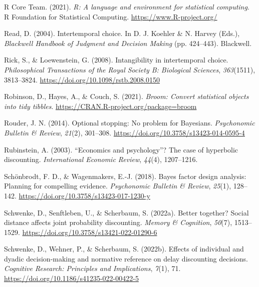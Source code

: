 \documentclass[
  pub,floatsintext]{apa6}
\newlength{\cslhangindent}
\newlength{\cslentryspacingunit} %
\newenvironment{CSLReferences}[2] %
 {%
  \setlength{\parindent}{0pt}
  \ifodd #1
  \let\oldpar\par
  \def\par{\hangindent=\cslhangindent\oldpar}
  \fi
  \setlength{\parskip}{#2\cslentryspacingunit}
 }%
 {}
\begin{document}
\begin{CSLReferences}{1}{0}
\leavevmode{}%
R Core Team. (2021). \emph{R: A language and environment for statistical computing}. R Foundation for Statistical Computing. \url{https://www.R-project.org/}

\leavevmode{}%
Read, D. (2004). Intertemporal choice. In D. J. Koehler \& N. Harvey (Eds.), \emph{Blackwell {Handbook} of {Judgment} and {Decision Making}} (pp. 424--443). {Blackwell}.

\leavevmode{}%
Rick, S., \& Loewenstein, G. (2008). Intangibility in intertemporal choice. \emph{Philosophical Transactions of the Royal Society B: Biological Sciences}, \emph{363}(1511), 3813--3824. \url{https://doi.org/10.1098/rstb.2008.0150}

\leavevmode{}%
Robinson, D., Hayes, A., \& Couch, S. (2021). \emph{Broom: Convert statistical objects into tidy tibbles}. \url{https://CRAN.R-project.org/package=broom}

\leavevmode{}%
Rouder, J. N. (2014). Optional stopping: {No} problem for {Bayesians}. \emph{Psychonomic Bulletin \& Review}, \emph{21}(2), 301--308. \url{https://doi.org/10.3758/s13423-014-0595-4}

\leavevmode{}%
Rubinstein, A. (2003). {``{Economics} and psychology''}? {The} case of hyperbolic discounting. \emph{International Economic Review}, \emph{44}(4), 1207--1216.

\leavevmode{}%
Schönbrodt, F. D., \& Wagenmakers, E.-J. (2018). Bayes factor design analysis: {Planning} for compelling evidence. \emph{Psychonomic Bulletin \& Review}, \emph{25}(1), 128--142. \url{https://doi.org/10.3758/s13423-017-1230-y}

\leavevmode{}%
Schwenke, D., Senftleben, U., \& Scherbaum, S. (2022a). Better together? {Social} distance affects joint probability discounting. \emph{Memory \& Cognition}, \emph{50}(7), 1513--1529. \url{https://doi.org/10.3758/s13421-022-01290-6}

\leavevmode{}%
Schwenke, D., Wehner, P., \& Scherbaum, S. (2022b). Effects of individual and dyadic decision-making and normative reference on delay discounting decisions. \emph{Cognitive Research: Principles and Implications}, \emph{7}(1), 71. \url{https://doi.org/10.1186/s41235-022-00422-5}


\end{CSLReferences}
\end{document}
